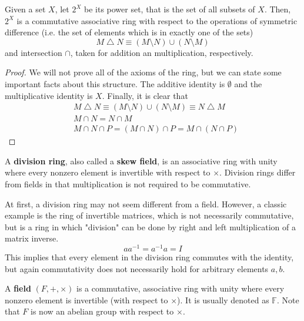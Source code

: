     \begin{proposition}
      Given a set $X$, let $2^X$ be its power set, that is the set of all subsets of $X$. Then, $2^X$ is a commutative associative ring with respect to the operations of symmetric difference (i.e. the set of elements which is in exactly one of the sets) 
      \begin{equation}
        M \bigtriangleup N \equiv (M \setminus N) \cup (N \setminus M)
      \end{equation}
      and intersection $\cap$, taken for addition an multiplication, respectively. 
    \end{proposition}
    \begin{proof}
      We will not prove all of the axioms of the ring, but we can state some important facts about this structure. The additive identity is $\emptyset$ and the multiplicative identity is $X$. Finally, it is clear that 
      \begin{align*}
        & M \bigtriangleup N \equiv (M \setminus N) \cup (N \setminus M) \equiv N \bigtriangleup M \\
        & M \cap N = N \cap M \\
        & M \cap N \cap P = (M \cap N) \cap P = M \cap (N \cap P)
      \end{align*}
    \end{proof}

    \begin{example}
      A \textbf{division ring}, also called a \textbf{skew field}, is an associative ring with unity where every nonzero element is invertible with respect to $\times$. Division rings differ from fields in that multiplication is not required to be commutative. 
    \end{example}

    At first, a division ring may not seem different from a field. However, a classic example is the ring of invertible matrices, which is not necessarily commutative, but is a ring in which "division" can be done by right and left multiplication of a matrix inverse. 
    \begin{equation}
      a a^{-1} = a^{-1} a = I
    \end{equation}
    This implies that every element in the division ring commutes with the identity, but again commutativity does not necessarily hold for arbitrary elements $a, b$. 

    \begin{definition}
      A \textbf{field} $(F, +, \times)$ is a commutative, associative ring with unity where every nonzero element is invertible (with respect to $\times$). It is usually denoted as $\mathbb{F}$. Note that $F$ is now an abelian group with respect to $\times$. 
    \end{definition}

